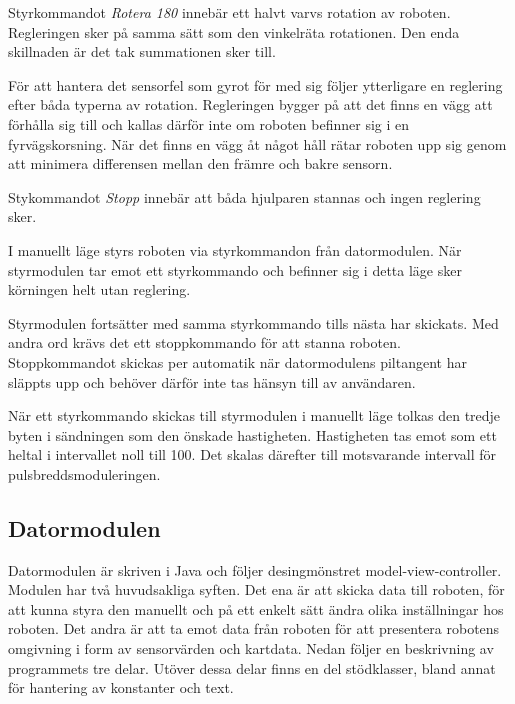 \documentclass[11pt]{article}
\begin{document}
\begin{flushleft}
\begin{description}[style=unboxed, leftmargin=0cm]
Styrkommandot \textit{Rotera 180\textdegree} innebär ett halvt varvs rotation av roboten. Regleringen sker på samma sätt som den vinkelräta rotationen. Den enda skillnaden är det tak summationen sker till. 

För att hantera det sensorfel som gyrot för med sig följer ytterligare en reglering efter båda typerna av rotation. Regleringen bygger på att det finns en vägg att förhålla sig till och kallas därför inte om roboten befinner sig i en fyrvägskorsning. När det finns en vägg åt något håll rätar roboten upp sig genom att minimera differensen mellan den främre och bakre sensorn. 

Stykommandot \textit{Stopp} innebär att båda hjulparen stannas och ingen reglering sker. 

\item[Manuellt läge] I manuellt läge styrs roboten via styrkommandon från datormodulen. När styrmodulen tar emot ett styrkommando och befinner sig i detta läge sker körningen helt utan reglering. 

Styrmodulen fortsätter med samma styrkommando tills nästa har skickats. Med andra ord krävs det ett stoppkommando för att stanna roboten. Stoppkommandot skickas per automatik när datormodulens piltangent har släppts upp och behöver därför inte tas hänsyn till av användaren. 

När ett styrkommando skickas till styrmodulen i manuellt läge tolkas den tredje byten i sändningen som den önskade hastigheten. Hastigheten tas emot som ett heltal i intervallet noll till 100. Det skalas därefter till motsvarande intervall för pulsbreddsmoduleringen.

  \end{description}

\subsection{Datormodulen}
Datormodulen är skriven i Java och följer desingmönstret model-view-controller. Modulen har två huvudsakliga syften. Det ena är att skicka data till roboten, för att kunna styra den manuellt och på ett enkelt sätt ändra olika inställningar hos roboten. Det andra är att ta emot data från roboten för att presentera robotens omgivning i form av sensorvärden och kartdata. Nedan följer en beskrivning av programmets tre delar. Utöver dessa delar finns en del stödklasser, bland annat för hantering av konstanter och text.%


\end{flushleft}
\end{document}
